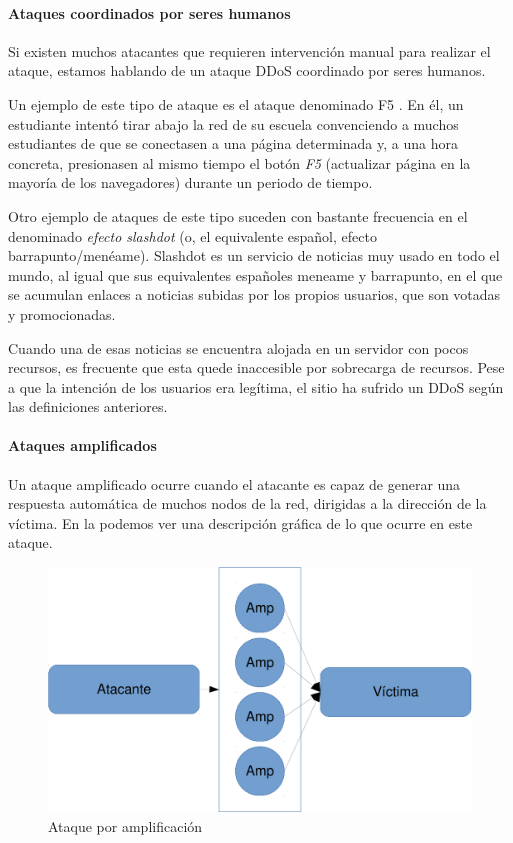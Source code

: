 \paragraph{Ataques coordinados por seres humanos}\mbox{\newline}

\noindent Si existen muchos atacantes que requieren intervención manual para realizar el ataque, estamos hablando de un 
ataque DDoS coordinado por seres humanos. 

Un ejemplo de este tipo de ataque es el ataque denominado F5 \cite{F5_attack}. En él, un estudiante intentó tirar abajo 
la red de su escuela convenciendo a muchos estudiantes de que se conectasen a una página determinada y, a una hora 
concreta, presionasen al mismo tiempo el botón \emph{F5} (actualizar página en la mayoría de los navegadores) durante 
un periodo de tiempo.

Otro ejemplo de ataques de este tipo suceden con bastante frecuencia en el denominado \emph{efecto slashdot} (o, el 
equivalente español, efecto barrapunto/menéame). Slashdot es un servicio de noticias muy usado en todo el mundo, al 
igual que sus equivalentes españoles meneame y barrapunto, en el que se acumulan enlaces a noticias subidas por los 
propios usuarios, que son votadas y promocionadas.

Cuando una de esas noticias se encuentra alojada en un servidor con pocos recursos, es frecuente que esta quede 
inaccesible por sobrecarga de recursos. Pese a que la intención de los usuarios era legítima, el sitio ha sufrido un 
\gls{DDoS} según las definiciones anteriores.

\paragraph{Ataques amplificados}\mbox{\newline} 

\noindent Un ataque amplificado ocurre cuando el atacante es capaz de generar una respuesta automática de muchos nodos 
de la red, dirigidas a la dirección de la víctima. En la  podemos ver una descripción gráfica de lo 
que ocurre en este ataque.

\begin{figure}[htbp]
\centering
\includegraphics[width=.8\textwidth]{CapituloDDoS/Figuras/Amplificacion}
\caption{Ataque por amplificación}
\end{figure}
%


